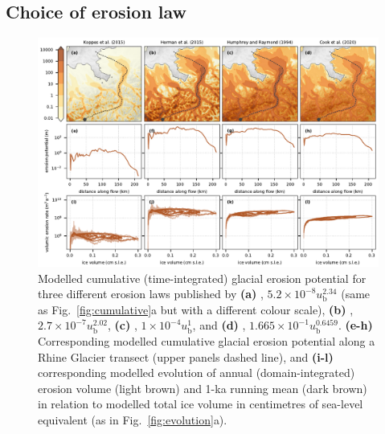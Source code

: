 \documentclass[esurf, manuscript]{copernicus}
\begin{document}
\subsection{Choice of erosion law}
\label{sec:powerlaws}

    \begin{figure}[t]
      \centerline{\includegraphics{alpero_powerlaws}}
      \caption{%
        Modelled cumulative (time-integrated) glacial erosion potential for
        three different erosion laws published by
        \textbf{(a)} \citet{Koppes.etal.2015},
          ${5.2 \times 10^{-8} u_\mathrm{b}^{2.34}}$ (same as
          Fig.~\ref{fig:cumulative}a but with a different colour scale),
        \textbf{(b)} \citet{Herman.etal.2015},
          ${2.7 \times 10^{-7} u_\mathrm{b}^{2.02}}$,
        \textbf{(c)} \citet{Humphrey.Raymond.1994},
          ${1 \times 10^{-4} u_\mathrm{b}^{1}}$, and
        \textbf{(d)} \citet{Cook.etal.2020},
          ${1.665 \times 10^{-1} u_\mathrm{b}^{0.6459}}$.
        \textbf{(e-h)} Corresponding modelled cumulative glacial erosion
          potential along a Rhine Glacier transect (upper panels dashed line), and
        \textbf{(i-l)} corresponding modelled evolution of annual
        (domain-integrated) erosion volume (light brown) and 1-ka
        running mean (dark brown) in relation to modelled total ice volume in
        centimetres of sea-level equivalent (as in Fig.~\ref{fig:evolution}a).}
      \label{fig:powerlaws}
    \end{figure}
\end{document}

